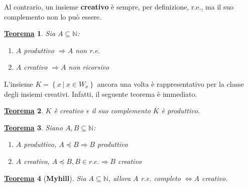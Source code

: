 \documentclass[a4paper]{article}
\newtheorem{theorem}{\textcolor{Red3}{\underline{Teorema}}}
\begin{document}
	Al contrario, un insieme \textbf{creativo} è sempre, per definizione, r.e., ma il suo complemento non lo può essere.\newline
	
	\begin{theorem}
		Sia $A \subseteq \mathbb{N}$:
		\begin{enumerate}
			\item $A$ produttivo $\Longrightarrow A$ non r.e.
			\item $A$ creativo $\Longrightarrow A$ non ricorsivo
		\end{enumerate}
	\end{theorem}
	\noindent
	L'insieme $K = \left\{x \: | \: x \in W_{x}\right\}$ ancora una volta è rappresentativo per la classe degli insiemi creativi. Infatti, il seguente teorema è immediato.
	\begin{theorem}
		$K$ è creativo e il suo complemento $\overline{K}$ è produttivo.
	\end{theorem}
	\begin{theorem}
		Siano $A,B \subseteq \mathbb{N}$:
		\begin{enumerate}
			\item $A$ produttivo, $A \preceq B \Longrightarrow B$ produttivo
			\item $A$ creativo, $A \preceq B, B \in r.e. \Longrightarrow B$ creativo
		\end{enumerate}
	\end{theorem}
	\begin{theorem}[\textbf{Myhill}]
		Sia $A \subseteq \mathbb{N}$, allora $A$ r.e. completo $\iff A$ creativo.
	\end{theorem}\newpage
\end{document}
